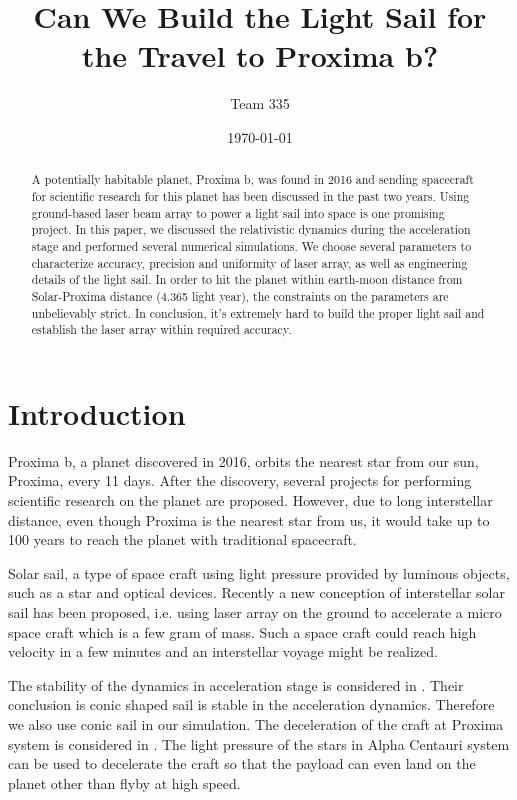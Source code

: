 \documentclass{article}
\begin{document}
\title{Can We Build the Light Sail for the Travel to Proxima b?}
\author{Team 335}
\date{\today}
\maketitle

\begin{abstract}
	A potentially habitable planet, Proxima b, was found in 2016 and sending spacecraft for scientific research for this planet has been discussed in the past two years. Using ground-based laser beam array to power a light sail into space is one promising project. In this paper, we discussed the relativistic dynamics during the acceleration stage and performed several numerical simulations. We choose several parameters to characterize accuracy, precision and uniformity of laser array, as well as engineering details of the light sail. In order to hit the planet within earth-moon distance from Solar-Proxima distance (4.365 light year), the constraints on the parameters are unbelievably strict. In conclusion, it's extremely hard to build the proper light sail and establish the laser array within required accuracy.
\end{abstract}


\section{Introduction}

Proxima b, a planet discovered in 2016, orbits the nearest star from our sun, Proxima, every 11 days. After the discovery, several projects for performing scientific research on the planet are proposed. However, due to long interstellar distance, even though Proxima is the nearest star from us, it would take up to 100 years to reach the planet with traditional spacecraft.  

Solar sail, a type of space craft using light pressure provided by luminous objects, such as a star and optical devices. Recently a new conception of interstellar solar sail has been proposed, i.e. using laser array on the ground to accelerate a micro space craft which is a few gram of mass. Such a space craft could reach high velocity in a few minutes and an interstellar voyage might be realized.

The stability of the dynamics in acceleration stage is considered in \cite{stab}. Their conclusion is conic shaped sail is stable in the acceleration dynamics. Therefore we also use conic sail in our simulation. The deceleration of the craft at Proxima system is considered in \cite{dec}. The light pressure of the stars in Alpha Centauri system can be used to decelerate the craft so that the payload can even land on the planet other than flyby at high speed.
\end{document}
